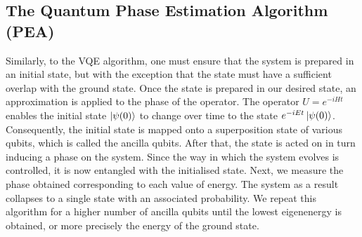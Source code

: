 \documentclass[12pt]{article}
\begin{document}
\subsection{The Quantum Phase Estimation Algorithm (PEA)}
Similarly, to the VQE algorithm, one must ensure that the system is prepared in an initial state, but with the exception that the state must have a sufficient overlap with the ground state. Once the state is prepared in our desired state, an approximation is applied to the phase of the operator. The operator $U = e^{-iHt}$ enables the initial state $\ket{\psi(0)}$ to change over time to the state $e^{-iEt}\ket{\psi(0)}$. Consequently, the initial state is mapped onto a superposition state of various qubits, which is called the ancilla qubits. After that, the state is acted on in turn inducing a phase on the system. Since the way in which the system evolves is controlled, it is now entangled with the initialised state. Next, we measure the phase obtained corresponding to each value of energy. The system as a result collapses to a single state with an associated probability. We repeat this algorithm for a higher number of ancilla qubits \cite[p.2]{tansuwannont2015quantum} until the lowest eigenenergy is obtained, or more precisely the energy of the ground state.\\

\noindent
{}
\\
\end{document}
